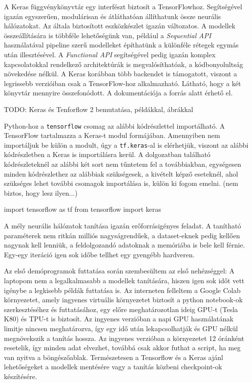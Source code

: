 A Keras függvénykönyvtár egy interfészt biztosít a TensorFlowhoz. Segítségével igazán egyszerűen, modulárisan és átláthatóan állíthatunk össze neurális hálózatokat. Az általa biztosított eszközkészlet igazán változatos. A modellek összeállítására is többféle lehetőségünk van, például a \textit{Sequential API} használatával pipeline szerű modelleket építhatünk a különféle rétegek egymás után illesztésével. A \textit{Functional API} segítségével pedig igazán komplex kapcsolatokkal rendelkező architektúrák is megvalósíthatóak, a kódbonyolultság növekedése nélkül. A Keras korábban több backendet is támogatott, viszont a legrissebb verzióiban csak a TensorFlow-hoz alkalmazható. Látható, hogy a két könyvtár mennyire összefonódott. A dokumentációja a \cite{keras} forrás alatt érhető el.

TODO: Keras és Tenforflow 2 bemutatása, példákkal, ábrákkal

Python-hoz a \texttt{tensorflow} csomag az alábbi kódrészlettel importálható. A TensorFlow tartalmazza a Keras-t modul formájában. Amennyiben nem importáljuk be külön a modult, úgy a \texttt{tf.keras}-al is elérhetjük, viszont az alábbi kódrészletben a Keras is importálásra kerül. A dolgozatban található kódrészleteknél az alábbi két sort nem tűntetem fel a továbbiakban, egységesen minden kódrészlethez az alábbiak szükségesek, a kivételt képző eseteknél, ahol szükséges lehet további csomagok importálása is, külön ki fogom emelni. (nem biztos, hogy lesz ilyen...)
\begin{python}
import tensorflow as tf
from tensorflow import keras
\end{python}


A mély neurális hálózatok tanítása igazán erőforrásigényes feladat. A tanítható paraméterek nem ritkán milliós nagyságrendűek, a dataset-eknek pedig kellően nagynak kell lenniük, a feldolgozandó adatoknak a memóriába is bele kell férnie. Egy-egy iteráció igen sok időbe tellhet egy gyengébb hardveren.

Az első demóprogramok futtatása során szembesültem az első nehézséggel: A laptopom nem a legalkalmasabb a modellek tanítására, hiszen igen sok időt vett igénybe a legkisebb példák futtatása is. Az interneten felleltem a Google Colab környezetet, amely ingyenes virtuális környezetet biztosít a python notebook-ok szerkesztéséhez és futtatásához, egy előre meghatározotlan ideig GPU-t (Tesla K80) és TPU-t is biztosít. Az ingyenes verzióban a napi GPU használatának limitje nincsen meghatározva, így egy idő után lekapcsolhatják és GPU nélkül megnövekszik a tanítás hossza. Az ingyenes verzióban a környezetet 12 óránként resetelik, így minden adat elvezhet, továbbá csak akkor futhat a script, ha meg van nyitva a böngészőablak. Természetesen a Tensorflow és a Keras ajánl lehetőségeket a modellek mentésére vagy a tanítás közbeni checkpoint-ok készítésére.

